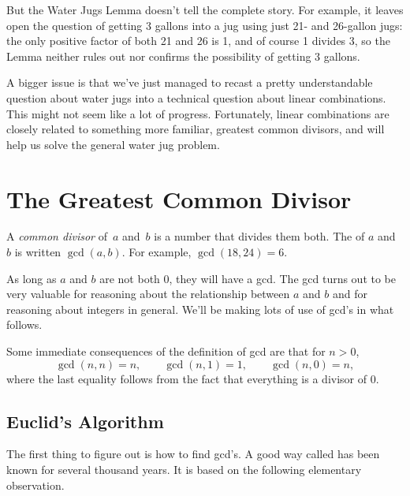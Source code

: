 But the Water Jugs Lemma doesn't tell the complete story.  For
example, it leaves open the question of getting 3 gallons into a jug
using just 21- and 26-gallon jugs: the only positive factor of both 21
and 26 is 1, and of course 1 divides 3, so the Lemma neither rules out
nor confirms the possibility of getting 3 gallons.

A bigger issue is that we've just managed to recast a pretty
understandable question about water jugs into a technical question
about linear combinations.  This might not seem like a lot of
progress.  Fortunately, linear combinations are closely related to
something more familiar, greatest common divisors, and
will help us solve the general water jug problem.

\begin{problems}
\practiceproblems
{}

\classproblems
{}

\end{problems}

\section{The Greatest Common Divisor}\label{sec:gcd}

A \emph{common divisor} of~$a$ and~$b$ is a number that divides them
both.  The  of $a$ and~$b$ is written%
$\gcd(a, b)$.  For example, $\gcd(18, 24) = 6$.

As long as $a$ and $b$ are not both 0, they will have a gcd.  The gcd
turns out to be very valuable for reasoning about the relationship
between $a$ and $b$ and for reasoning about integers in general.
We'll be making lots of use of gcd's in what follows.

Some immediate consequences of the definition of gcd are that for $n > 0$,
\[
\gcd(n, n) = n, \qquad \gcd(n, 1) = 1, \qquad  \gcd(n,0) = n,
\]
where the last equality follows from the fact that everything is a
divisor of 0.

\subsection{Euclid's Algorithm}\label{sec: Euclid}
The first thing to figure out is how to find gcd's.  A good way called  has been known for several thousand years.  It is based on the following
elementary observation.

